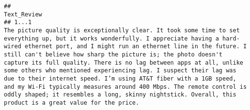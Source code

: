 \documentclass[
  11pt,
]{article}
\begin{document}
\begin{verbatim}
##                                                                                                                                                                                                                                                                                                                                                                                                                                                                                                                                                                                                                                                                                                                                                                                                                                                                                                                                                                                                                                                                                                                                                                                                                                                                                                                                                                                                                                                                                                                                                                        Text_Review
## 1...1                                                                                                                                                                                                                                                                                                                                                                                                                                                                                                                                                                                                                                                                                                                                                                                                                                                                                             The picture quality is exceptionally clear. It took some time to set everything up, but it works wonderfully. I appreciate having a hard-wired ethernet port, and I might run an ethernet line in the future. I still can't believe how sharp the picture is; the photo doesn't capture its full quality. There is no lag between apps at all, unlike some others who mentioned experiencing lag. I suspect their lag was due to their internet speed. I’m using AT&T fiber with a 1GB speed, and my Wi-Fi typically measures around 400 Mbps. The remote control is oddly shaped; it resembles a long, skinny nightstick. Overall, this product is a great value for the price.

\end{verbatim}
\end{document}
